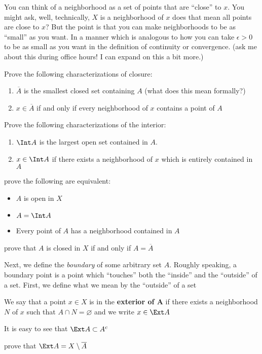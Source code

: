 \documentclass{pset}
\begin{document}
You can think of a neighborhood as a set of points that are ``close'' to $x$. You might ask, well, technically, $X$ is a neighborhood of $x$ does 
that mean all points are close to $x$? But the point is that you can make neighborhoods to be as ``small'' as you want. In a manner which is 
analogous to how you can take $\epsilon>0$ to be as small as you want in the definition of continuity or convergence. (ask me about this during 
office hours! I can expand on this a bit more.)
\begin{exercise}[\skipforward]
    Prove the following characterizations of closure:
    \begin{enumerate}[label=\roman*.]
        \item $\overline{A}$ is the smallest closed set containing $A$ (what does this mean formally?)
        \item $x\in \overline{A}$ if and only if every neighborhood of $x$ contains a point of $A$
    \end{enumerate}
\end{exercise}
\begin{exercise}[\skipforward]
    Prove the following characterizations of the interior:
    \begin{enumerate}[label=\roman*.]
        \item $\Int A$ is the largest open set contained in $A$.
        \item $x\in \Int A$ if there exists a neighborhood of $x$ which is entirely contained in $A$
    \end{enumerate}
\end{exercise}
\begin{exercise}
    prove the following are equivalent:
    \begin{itemize}
        \item $A$ is open in $X$
        \item $A=\Int A$
        \item Every point of $A$ has a neighborhood contained in $A$
    \end{itemize}
\end{exercise}
\begin{exercise}
    prove that $A$ is closed in $X$ if and only if $A=\overline A$
\end{exercise}
Next, we define the \emph{boundary} of some arbitrary set $A$. Roughly speaking, a boundary point is a point which ``touches'' both the ``inside'' and 
the ``outside'' of a set. First, we define what we mean by the ``outside'' of a set
\begin{definition}
    We say that a point $x\in X$ is in the \textbf{exterior of $\mathbf A$} if there exists a neighborhood $N$ of $x$ such that $A\cap N = \varnothing$ and 
    we write $x\in \Ext A$
\end{definition}
It is easy to see that $\Ext A\subset A^c$
\begin{exercise}
    prove that $\Ext A=X\setminus \overline A$
\end{exercise}
\end{document}
